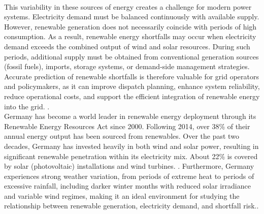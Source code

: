 \documentclass[conference]{IEEEtran}
\begin{document}
\\This variability in these sources of energy creates a challenge for modern power systems. Electricity demand must be balanced continuously with available supply. However, renewable generation does not necessarily coincide with periods of high consumption. As a result, renewable energy shortfalls may occur when electricity demand exceeds the combined output of wind and solar resources. During such periods, additional supply must be obtained from conventional generation sources (fossil fuels), imports, storage systems, or demand-side management strategies. Accurate prediction of renewable shortfalls is therefore valuable for grid operators and policymakers, as it can improve dispatch planning, enhance system reliability, reduce operational costs, and support the efficient integration of renewable energy into the grid. \cite{kadampur_solar_case}.
\\ Germany has become a world leader in renewable energy deployment through its Renewable Energy Resources Act since 2000. Following 2014,  over 38\% of their annual energy output has been sourced from renewables. Over the past two decades, Germany has invested heavily in both wind and solar power, resulting in significant renewable penetration within its electricity mix. About 22\% is covered by solar (photovoltaic) installations and wind turbines. \cite{bmwe_renewable_energy}. Furthermore, Germany experiences strong weather variation, from periods of extreme heat to periods of excessive rainfall, including darker winter months with reduced solar irradiance and variable wind regimes, making it an ideal environment for studying the relationship between renewable generation, electricity demand, and shortfall risk.\cite{dwd_climate}.
\end{document}
